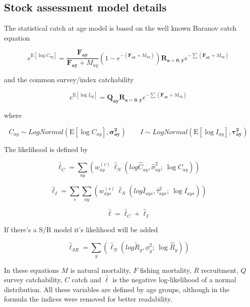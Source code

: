\documentclass[a4paper,english,10pt]{article}\usepackage[]{graphicx}\usepackage[]{color}
\newcommand{\E}[1]{\text{E}\left[#1\right]}
\begin{document}
\subsection{Stock assessment model details}

The statistical catch at age model is based on the well known Baranov catch equation

\begin{equation*}
e^{\E{\log C_{ay}}} = \frac{\mathbf{F_{ay}}}{\mathbf{F_{ay}}+M_{ay}}\left(1 - e^{-(\mathbf{F_{ay}}+M_{ay})}\right) \mathbf{R_{a=0,y}}e^{-\sum (\mathbf{F_{ay}} + M_{ay})}
\end{equation*}

and the common survey/index catchability 

\begin{equation*}
e^{\E{\log I_{ay}}} = \mathbf{Q_{ay}} \mathbf{R_{a=0,y}}e^{-\sum (\mathbf{F_{ay}} + M_{ay})}
\end{equation*}

where 

\begin{equation*}
C_{ay} \sim LogNormal(\E{\log C_{ay}}, \mathbf{\sigma^2_{ay}}) \qquad I \sim LogNormal(\E{\log I_{ay}}, \mathbf{\tau^2_{ay}})
\end{equation*}

The likelihood is defined by 

\begin{equation*}
\hat{\ell}_C = \sum_{ay}(w^{(c)}_{ay}\ \hat{\ell}_N(log \hat{C}_{ay}, \hat{\sigma}^2_{ay};\ \log C_{ay})) 
\end{equation*}

\begin{equation*}
\hat{\ell}_I = \sum_s \sum_{ay}(w^{(s)}_{ays}\ \hat{\ell}_N(log \hat{I}_{ays}, \hat{\tau}_{ays}^2;\ \log I_{ays}))
\end{equation*}

\begin{equation*}
\hat{\ell} = \hat{\ell}_C + \hat{\ell}_I
\end{equation*}

If there's a S/R model it's likelihood will be added

\begin{equation*}
\hat{\ell}_{SR} = \sum_y( \hat{\ell}_N(log \tilde{R}_y, \phi_y^2;\ \log \hat{R}_y))
\end{equation*}

In these equations $M$ is natural mortality, $F$ fishing mortality, $R$ recruitment, $Q$ survey catchability, $C$ catch and $\hat{\ell}$ is the negative log-likelihood of a normal distribution. All these variables are defined by age groups, although in the formula the indices were removed for better readability.
 
\end{document}
